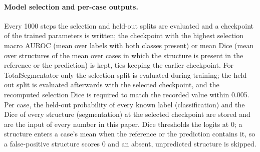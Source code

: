 \begin{table}[htbp]
\centering
\caption{Segmentation settings per method. All runs: AdamW, 8000 steps (24\,000 for the AMOS22 and TotalSegmentator joint models; two-stage methods split the budget in halves), four crops per step, warm-up 10\%, cosine to $10^{-6}$, bf16. LoRA-type adapters as in Table~\ref{tab:optim}.}
\label{tab:optimseg}
\end{table}

\paragraph{Model selection and per-case outputs.} Every 1000 steps the selection and held-out splits are evaluated and a checkpoint of the trained parameters is written; the checkpoint with the highest selection macro AUROC (mean over labels with both classes present) or mean Dice (mean over structures of the mean over cases in which the structure is present in the reference or the prediction) is kept, ties keeping the earlier checkpoint. For TotalSegmentator only the selection split is evaluated during training; the held-out split is evaluated afterwards with the selected checkpoint, and the recomputed selection Dice is required to match the recorded value within 0.005. Per case, the held-out probability of every known label (classification) and the Dice of every structure (segmentation) at the selected checkpoint are stored and are the input of every number in this paper. Dice thresholds the logits at 0; a structure enters a case's mean when the reference or the prediction contains it, so a false-positive structure scores 0 and an absent, unpredicted structure is skipped.

